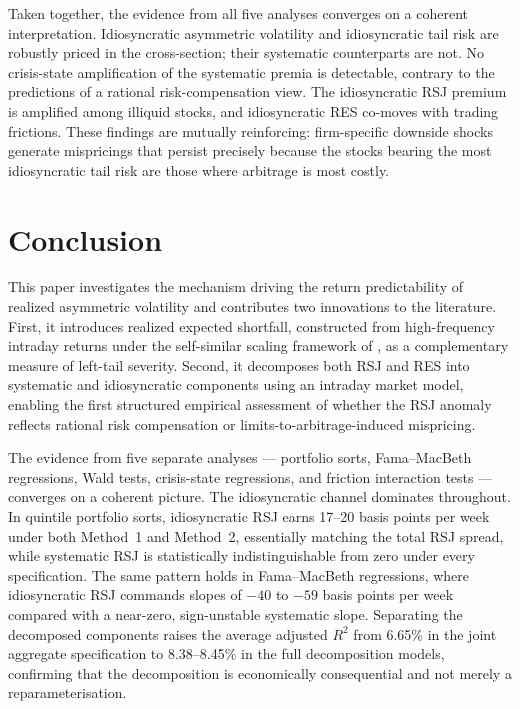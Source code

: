 \documentclass[11pt,a4paper]{article}
\begin{document}
Taken together, the evidence from all five analyses converges on a coherent
interpretation. Idiosyncratic asymmetric volatility and idiosyncratic tail risk are
robustly priced in the cross-section; their systematic counterparts are not. No
crisis-state amplification of the systematic premia is detectable, contrary to the
predictions of a rational risk-compensation view. The idiosyncratic RSJ premium is
amplified among illiquid stocks, and idiosyncratic RES co-moves with trading frictions.
These findings are mutually reinforcing: firm-specific downside shocks generate
mispricings that persist precisely because the stocks bearing the most idiosyncratic
tail risk are those where arbitrage is most costly.

\FloatBarrier

\section{Conclusion}
\label{sec:conclusion}

This paper investigates the mechanism driving the return predictability of realized
asymmetric volatility and contributes two innovations to the literature. First, it
introduces realized expected shortfall, constructed from high-frequency intraday returns
under the self-similar scaling framework of \citet{Dimitriadis03072022}, as a
complementary measure of left-tail severity. Second, it decomposes both RSJ and RES into
systematic and idiosyncratic components using an intraday market model, enabling the
first structured empirical assessment of whether the RSJ anomaly reflects rational risk
compensation or limits-to-arbitrage-induced mispricing.

The evidence from five separate analyses --- portfolio sorts, Fama--MacBeth regressions,
Wald tests, crisis-state regressions, and friction interaction tests --- converges on a
coherent picture. The idiosyncratic channel dominates throughout. In quintile portfolio
sorts, idiosyncratic RSJ earns 17--20 basis points per week under both Method~1 and
Method~2, essentially matching the total RSJ spread, while systematic RSJ is
statistically indistinguishable from zero under every specification. The same pattern
holds in Fama--MacBeth regressions, where idiosyncratic RSJ commands slopes of $-40$ to
$-59$ basis points per week compared with a near-zero, sign-unstable systematic slope.
Separating the decomposed components raises the average adjusted $R^2$ from 6.65\%
in the joint aggregate specification to 8.38--8.45\% in the full decomposition models,
confirming that the decomposition is economically consequential and not merely a
reparameterisation.
\end{document}
